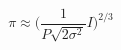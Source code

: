 \documentclass[preview]{standalone}
\begin{document}
\begin{equation*}
\pi \approx \bigg(\frac{1}{P\sqrt{2\sigma^2}}I\bigg)^{2/3}
\end{equation*}
\end{document}
